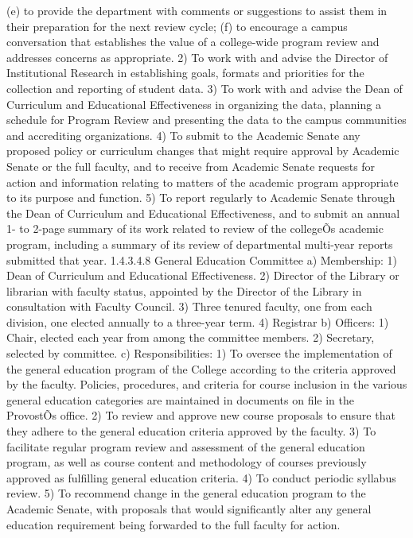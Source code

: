 \documentclass[letterpaper, 11pt]{article}
\begin{document}
(e) to provide the department with comments or suggestions to assist them in their preparation for the next review cycle;
(f) to encourage a campus conversation that establishes the value of a college-wide program review and addresses concerns as appropriate.
2) To work with and advise the Director of Institutional Research in establishing goals, formats and priorities for the collection and reporting of student data.
3) To work with and advise the Dean of Curriculum and Educational Effectiveness in organizing the data, planning a schedule for Program Review and presenting the data to the campus communities and accrediting organizations.
4) To submit to the Academic Senate any proposed policy or curriculum changes that might require approval by Academic Senate or the full faculty, and to receive from Academic Senate requests for action and information relating to matters of the academic program appropriate to its purpose and function.
5) To report regularly to Academic Senate through the Dean of Curriculum and Educational Effectiveness, and to submit an annual 1- to 2-page summary of its work related to review of the collegeÕs academic program, including a summary of its review of departmental multi-year reports submitted that year.
1.4.3.4.8 General Education Committee 
a) Membership:
1) Dean of Curriculum and Educational Effectiveness.
2) Director of the Library or librarian with faculty status, appointed by the Director of the Library in consultation with Faculty Council.
3) Three tenured faculty, one from each division, one elected annually to a three-year term.
4) Registrar
b) Officers:
1) Chair, elected each year from among the committee members.
2) Secretary, selected by committee.
c) Responsibilities:
1) To oversee the implementation of the general education program of the College according to the criteria approved by the faculty.  Policies, procedures, and criteria for course inclusion in the various general education categories are maintained in documents on file in the ProvostÕs office.
2) To review and approve new course proposals to ensure that they adhere to the general education criteria approved by the faculty. 
3) To facilitate regular program review and assessment of the general education program, as well as course content and methodology of courses previously approved as fulfilling general education criteria.
4) To conduct periodic syllabus review.
5) To recommend change in the general education program to the Academic Senate, with proposals that would significantly alter any general education requirement being forwarded to the full faculty for action.
\end{document}
